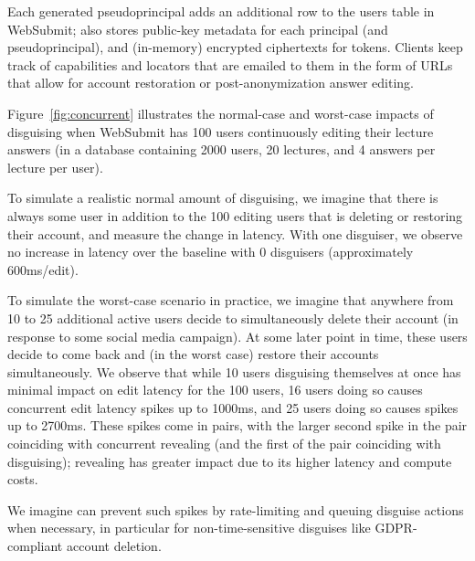  Each generated pseudoprincipal adds an additional
row to the users table in WebSubmit; \sys also stores public-key metadata for each principal (and
pseudoprincipal), and (in-memory) encrypted ciphertexts for tokens.  Clients keep track of
capabilities and locators that are emailed to them in the form of URLs that allow for account
restoration or post-anonymization answer editing.

 Figure~\ref{fig:concurrent} illustrates the
normal-case and worst-case impacts of disguising when WebSubmit has 100 users continuously editing
their lecture answers (in a database containing 2000 users, 20 lectures, and 4 answers per lecture
per user).

To simulate a realistic normal amount of disguising, we imagine that there is always some user in
addition to the 100 editing users that is deleting or restoring their account, and measure the
change in latency. With one disguiser, we observe no increase in latency over the baseline with 0
disguisers (approximately 600ms/edit). 

To simulate the worst-case scenario in practice, we imagine that anywhere from 10 to 25 additional
active users decide to simultaneously delete their account (\eg in response to some social media
campaign). At some later point in time, these users decide to come back and (in the worst case)
restore their accounts simultaneously. We observe that while 10 users disguising themselves at once
has minimal impact on edit latency for the 100 users, 16 users doing so causes
concurrent edit latency spikes up to 1000ms, and 25 users doing so causes spikes up to 2700ms.  
%
These spikes come in pairs, with the larger second spike in the pair coinciding with concurrent
revealing (and the first of the pair coinciding with disguising); revealing has greater impact due
to its higher latency and compute costs.

We imagine \sys can prevent such spikes by rate-limiting and queuing disguise actions when
necessary, in particular for non-time-sensitive disguises like GDPR-compliant account deletion.

